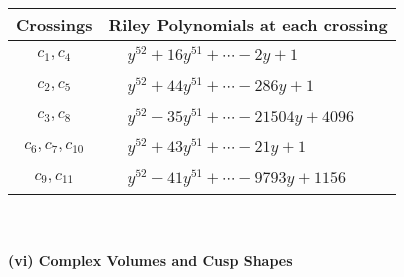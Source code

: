 \documentclass[1p]{elsarticle_modified}
\theoremstyle{definition}
\begin{document}
\begin{tabular}{m{50pt}|m{274pt}}
Crossings & \hspace{64pt}Riley Polynomials at each crossing \\
\hline $$\begin{aligned}c_{1},c_{4}\end{aligned}$$&$\begin{aligned}
&y^{52}+16 y^{51}+\cdots-2 y+1
\end{aligned}$\\
\hline $$\begin{aligned}c_{2},c_{5}\end{aligned}$$&$\begin{aligned}
&y^{52}+44 y^{51}+\cdots-286 y+1
\end{aligned}$\\
\hline $$\begin{aligned}c_{3},c_{8}\end{aligned}$$&$\begin{aligned}
&y^{52}-35 y^{51}+\cdots-21504 y+4096
\end{aligned}$\\
\hline $$\begin{aligned}c_{6},c_{7},c_{10}\end{aligned}$$&$\begin{aligned}
&y^{52}+43 y^{51}+\cdots-21 y+1
\end{aligned}$\\
\hline $$\begin{aligned}c_{9},c_{11}\end{aligned}$$&$\begin{aligned}
&y^{52}-41 y^{51}+\cdots-9793 y+1156
\end{aligned}$\\
\hline
\end{tabular}\\~\\
\newpage\flushleft \textbf{(vi) Complex Volumes and Cusp Shapes}
\end{document}
